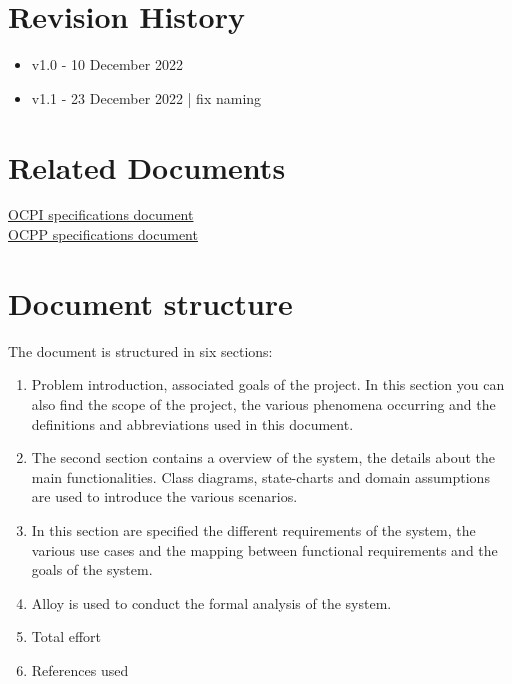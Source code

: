 \section{Revision History}
\begin{itemize}
	\item v1.0 - 10 December 2022
	\item v1.1 - 23 December 2022 | fix naming 
\end{itemize}

\section{Related Documents}
\href{../Specs/OCPI-2.2.1.pdf}{OCPI specifications document}\\
\href{../Specs/ocpp-1.6.pdf.pdf}{OCPP specifications document}

\section{Document structure}
The document is structured in six sections:

\begin{enumerate}
	\item Problem introduction, associated goals of the project. In this section you can also find the scope of the project, the various phenomena occurring and the definitions and abbreviations used in this document.
	\item The second section contains a overview of the system, the details about the main functionalities. Class diagrams, state-charts and domain assumptions are used to introduce the various scenarios.
	\item In this section are specified the different requirements of the system, the various use cases and the mapping between functional requirements and the goals of the system.
	\item Alloy is used to conduct the formal analysis of the system.
	\item Total effort
	\item References used
\end{enumerate}

